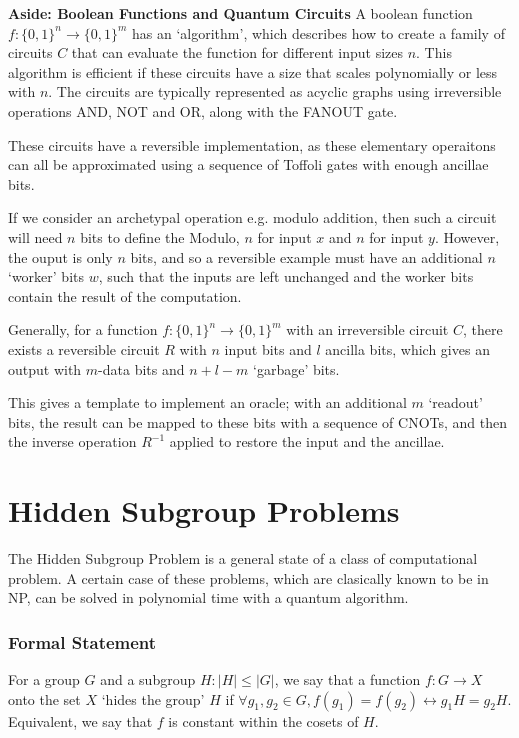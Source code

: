 \documentclass[11pt]{article}
\begin{document}
\hrulefill

\textbf{Aside: Boolean Functions and Quantum Circuits}
A boolean function $f : \{0,1\}^{n}\rightarrow\{0,1\}^{m}$ has an `algorithm', which describes how to create a family of circuits $C$ that can evaluate the function for different input sizes $n$. This algorithm is efficient if these circuits have a size that scales polynomially or less with $n$. The circuits are typically represented as acyclic graphs using irreversible operations AND, NOT and OR, along with the FANOUT gate.

These circuits have a reversible implementation, as these elementary operaitons can all be approximated using a sequence of Toffoli gates with enough ancillae bits.

If we consider an archetypal operation e.g. modulo addition, then such a circuit will need $n$ bits to define the Modulo, $n$ for input $x$ and $n$ for input $y$. However, the ouput is only $n$ bits, and so a reversible example must have an additional $n$ `worker' bits $w$, such that the inputs are left unchanged and the worker bits contain the result of the computation.

Generally, for a function $f : \{0,1\}^{n}\rightarrow\{0,1\}^{m}$ with an irreversible circuit $C$, there exists a reversible circuit $R$ with $n$ input bits and $l$ ancilla bits, which gives an output with $m$-data bits and $n+l-m$ `garbage' bits.

This gives a template to implement an oracle; with an additional $m$ `readout' bits, the result can be mapped to these bits with a sequence of CNOTs, and then the inverse operation $R^{-1}$ applied to restore the input and the ancillae.

\hrulefill

\section{Hidden Subgroup Problems}

The Hidden Subgroup Problem is a general state of a class of computational problem. A certain case of these problems, which are clasically known to be in NP, can be solved in polynomial time with a quantum algorithm.

\subsubsection*{Formal Statement}
For a group $G$ and a subgroup $H : \vert H\vert \leq \vert G\vert$, we say that a function $f: G\rightarrow X$ onto the set $X$ `hides the group' $H$ if $\forall g_{1},g_{2}\in G, f(g_{1})=f(g_{2}) \leftrightarrow g_{1}H=g_{2}H$. Equivalent, we say that $f$ is constant within the cosets of $H$.
\end{document}

